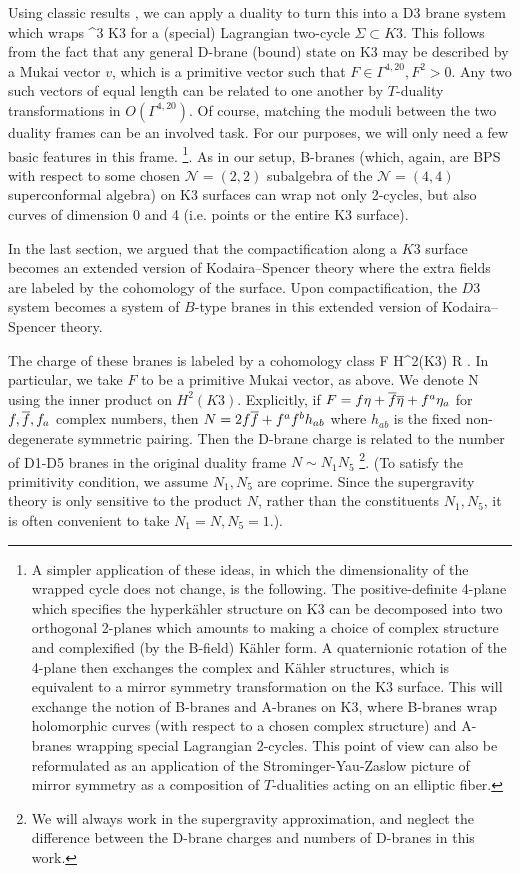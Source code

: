 \documentclass[../main.tex]{subfiles}
\begin{document}
Using classic results \cite{Dijkgraaf:1998gf}, we can apply a duality to turn this into a D3 brane system which wraps 
\beqn
\C {} \times \Sigma \subset \C^3 \times K3 
\eeqn
for a (special) Lagrangian two-cycle $\Sigma \subset K3$. 
This follows from the fact that any general D-brane (bound) state on K3 may be described by a Mukai vector $v$, which is a primitive vector such that $F \in \Gamma^{4, 20}, F^2>0$. 
Any two such vectors of equal length can be related to one another by $T$-duality transformations in $O(\Gamma^{4, 20})$. Of course, matching the moduli between the two duality frames can be an involved task. For our purposes, we will only need a few basic features in this frame. \footnote{A simpler application of these ideas, in which the dimensionality of the wrapped cycle does not change, is the following. The positive-definite 4-plane which specifies the hyperk{\"a}hler structure on K3 can be decomposed into two orthogonal 2-planes which amounts to making a choice of complex structure and complexified (by the B-field) K{\"a}hler form. A quaternionic rotation of the 4-plane then exchanges the complex and K{\"a}hler structures, which is equivalent to a mirror symmetry transformation on the K3 surface. This will exchange the notion of B-branes and A-branes on K3, where B-branes wrap holomorphic curves (with respect to a chosen complex structure) and A-branes wrapping special Lagrangian 2-cycles. This point of view can also be reformulated as an application of the Strominger-Yau-Zaslow \cite{SYZ} picture of mirror symmetry as a composition of $T$-dualities acting on an elliptic fiber.}. As in our setup, B-branes (which, again, are BPS with respect to some chosen $\mathcal{N}=(2, 2)$ subalgebra of the $\mathcal{N}=(4, 4)$ superconformal algebra) on K3 surfaces can wrap not only 2-cycles, but also curves of dimension 0 and 4 (i.e. points or the entire K3 surface).

In the last section, we argued that the compactification along a $K3$ surface becomes an extended version of Kodaira--Spencer theory where the extra fields are labeled by the cohomology of the surface.
Upon compactification, the $D3$ system becomes a system of $B$-type branes in this extended version of Kodaira--Spencer theory.

The charge of these branes is labeled by a cohomology class 
\beqn
F \in H^2(K3) \subset R .
\eeqn
 In particular, we take $F$ to be a primitive Mukai vector, as above. We denote 
\beqn
N  {}
\eeqn
using the inner product on $H^2(K3)$. 
Explicitly, if $F = f \eta + \overline f \overline \eta + f^a \eta_a$ for $f, \overline f, f_a$ complex numbers, then $N = 2 f \overline f + f^{a} f^{b} h_{ab}$ where $h_{ab}$ is the fixed non-degenerate symmetric pairing. Then the D-brane charge is related to the number of D1-D5 branes in the original duality frame $N \sim N_1 N_5$ \footnote{We will always work in the supergravity approximation, and neglect the difference between the D-brane charges and numbers of D-branes in this work.}. (To satisfy the primitivity condition, we assume $N_1, N_5$ are coprime. Since the supergravity theory is only sensitive to the product $N$, rather than the constituents $N_1, N_5$, it is often convenient to take $N_1 = N, N_5 = 1$.).
\end{document}

